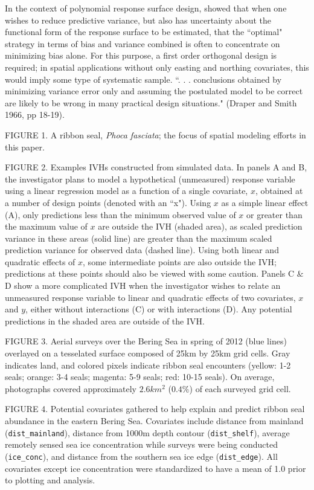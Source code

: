 \documentclass[12pt,english]{article}
\begin{document}
\begin{spacing}{1.9}
In the context of polynomial response surface design, \citet{BoxDraper1959} showed that when one wishes to reduce predictive variance, but also has uncertainty about the functional form of the response surface to be estimated, that the ``optimal" strategy in terms of bias and variance combined is often to concentrate on minimizing bias alone.  For this purpose, a first order orthogonal design is required; in spatial applications without only easting and northing covariates, this would imply some type of systematic sample.  ``. . . conclusions obtained by minimizing variance error only and assuming the postulated model to be correct are likely to be wrong in many practical design situations." (Draper and Smith 1966, pp 18-19).




FIGURE 1. A ribbon seal, {\it Phoca fasciata}; the focus of spatial modeling efforts in this paper.

FIGURE 2. Examples IVHs constructed from simulated data.  In panels A and B, the investigator plans to model a hypothetical (unmeasured) response variable using a linear regression model as a function of a single covariate, $x$, obtained at a number of design points (denoted with an ``x").  Using $x$ as a simple linear effect (A), only predictions less than the minimum observed value of $x$ or greater than the maximum value of $x$ are outside the IVH (shaded area), as scaled prediction variance in these areas (solid line) are greater than the maximum scaled prediction variance for observed data (dashed line).  Using both linear and quadratic effects of $x$, some intermediate points are also outside the IVH; predictions at these points should also be viewed with some caution.  Panels C $\&$ D show a more complicated IVH when the investigator wishes to relate an unmeasured response variable to linear and quadratic effects of two covariates, $x$ and $y$, either without interactions (C) or with interactions (D).  Any potential predictions in the shaded area are outside of the IVH.

FIGURE 3. Aerial surveys over the Bering Sea in spring of 2012 (blue lines) overlayed on
a tesselated surface composed of 25km by 25km grid cells.  Gray indicates land, and colored pixels indicate ribbon seal encounters (yellow: 1-2 seals; orange: 3-4 seals; magenta: 5-9 seals; red: 10-15 seals).  On average, photographs covered approximately $2.6km^2$ ($0.4\%$) of each surveyed grid cell.

FIGURE 4. Potential covariates gathered to help explain and predict ribbon seal abundance in the eastern Bering Sea.  Covariates include distance from mainland (\texttt{dist\_mainland}), distance from 1000m depth contour (\texttt{dist\_shelf}), average remotely sensed sea ice concentration while surveys were being conducted (\texttt{ice\_conc}), and distance from the southern sea ice edge (\texttt{dist\_edge}).  All covariates except ice concentration were standardized to have a mean of 1.0 prior to plotting and analysis.


\end{spacing}
\end{document}
